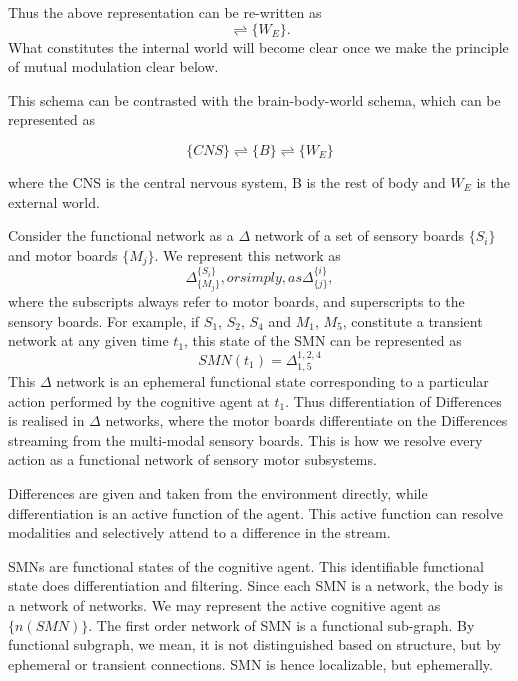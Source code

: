 Thus the above representation can be re-written as 
\begin{equation}
[\{n(SMN)\}_i \rightleftharpoons \{n(SMN)\}_j] \rightleftharpoons \{W_E\}.
\end{equation}
What constitutes the internal world will become clear once we make the principle of mutual modulation clear below.

This schema can be contrasted with the brain-body-world schema, which can be represented as 

\begin{equation}
\{CNS\} \rightleftharpoons \{B\} \rightleftharpoons \{W_E\}
\end{equation}

where the CNS is the central nervous system, B is the rest of body and $W_E$ is the external world.

Consider the functional network as a $\Delta$ network of a set of sensory boards $\{S_i\}$ and motor boards $\{M_j\}$. We represent this network as 
\begin{equation}\label{delta_notation}\Delta^{\{S_i\}}_{\{M_j\}}, or simply, as  \Delta^{\{i\}}_{\{j\}},
\end{equation} 
where the subscripts always refer to motor boards, and superscripts to the sensory boards. For example, if $S_1$, $S_2$, $S_4$ and $M_1$, $M_5$, constitute a transient network at any given time $t_1$, this state of the SMN can be represented as 
\begin{equation}\label{delta_eg}SMN(t_1) = \Delta^{1,2,4}_{1,5}
\end{equation} 
This $\Delta$ network is an ephemeral functional state corresponding to a particular action performed by the cognitive agent at $t_1$. Thus differentiation of Differences is realised in $\Delta$ networks, where the motor boards differentiate on the Differences streaming from the multi-modal sensory boards. This is how we resolve every action as a functional network of sensory motor subsystems.

Differences are given and taken from the environment directly, while differentiation is an active function of the agent. This active function can resolve modalities and selectively attend to a difference in the stream.

SMNs are functional states of the cognitive agent. This identifiable functional state does differentiation and filtering. Since each SMN is a network, the body is a network of networks. We may represent the active cognitive agent as $\{n(SMN)\}$. The first order network of SMN is a functional sub-graph. By functional subgraph, we mean, it is not distinguished based on structure, but by ephemeral or transient connections. SMN is hence localizable, but ephemerally.

